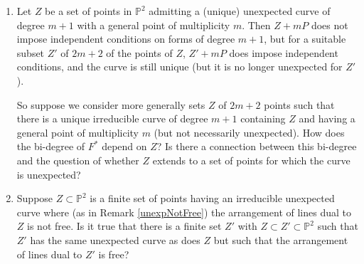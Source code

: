 \documentclass[12pt]{amsart}
\numberwithin{equation}{section}
\theoremstyle{definition}
\newcommand{\PP}{ \ensuremath{\mathbb{P}}}
\begin{document}
\begin{enumerate}
\item Let $Z$ be a set of points in $\PP^2$ admitting a (unique) unexpected curve of degree $m+1$ with a general point of multiplicity $m$. 
Then $Z + mP$ does not impose independent conditions on forms of degree $m+1$, but for a suitable subset $Z'$ of $2m+2$ of the points of $Z$, $Z' + mP$ 
does impose independent conditions, and the curve is still unique (but it is no longer unexpected for $Z'$). 

So suppose we consider more generally sets $Z$ of $2m+2$ points such that there is a unique irreducible curve of degree $m+1$ containing $Z$ and having a 
general point of multiplicity $m$ (but not necessarily unexpected). How does the bi-degree of $F^*$ depend on $Z$? Is there a connection between this bi-degree 
and the question of whether $Z$ extends to a set of points for which the curve is unexpected? 

\item Suppose $Z\subset\PP^2$ is a finite set of points having an irreducible unexpected curve where (as in Remark \ref{unexpNotFree})
the arrangement of lines dual to $Z$ is not free. Is it true that there is a finite set $Z'$ with $Z\subset Z'\subset\PP^2$ such that $Z'$ has 
the same unexpected curve as does $Z$ but such that the arrangement of lines dual to $Z'$ is free?

\end{enumerate}


\end{document}
